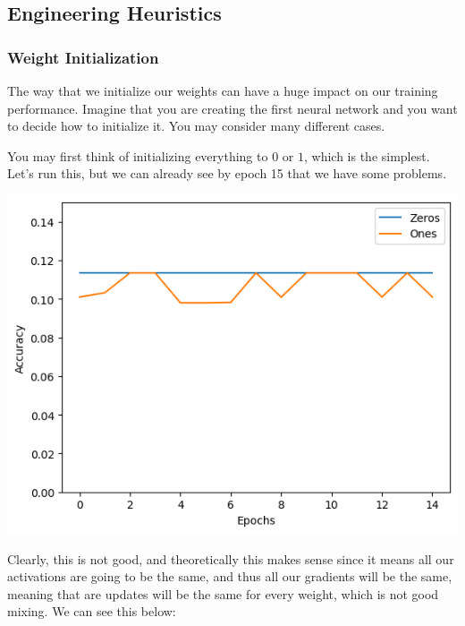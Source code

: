 \documentclass{article}
\begin{document}
\subsection{Engineering Heuristics}

  \subsubsection{Weight Initialization}

    The way that we initialize our weights can have a huge impact on our training performance. Imagine that you are creating the first neural network and you want to decide how to initialize it. You may consider many different cases. 

    \begin{example}
      You may first think of initializing everything to $0$ or $1$, which is the simplest. Let's run this, but we can already see by epoch 15 that we have some problems. 
      \begin{center}
        \includegraphics[scale=0.5]{img/first_initialize.png}
      \end{center}
      Clearly, this is not good, and theoretically this makes sense since it means all our activations are going to be the same, and thus all our gradients will be the same, meaning that are updates will be the same for every weight, which is not good mixing. We can see this below: 
    \end{example}
\end{document}
